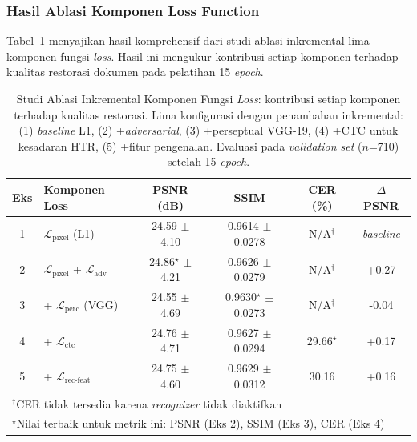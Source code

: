 \documentclass[12pt,a4paper]{article}
\begin{document}
\subsubsection{Hasil Ablasi Komponen Loss Function}
\label{subsubsec:hasil-ablasi-loss}

Tabel~\ref{tab:ablasi-loss-results} menyajikan hasil komprehensif dari studi ablasi inkremental lima komponen fungsi \textit{loss}. Hasil ini mengukur kontribusi setiap komponen terhadap kualitas restorasi dokumen pada pelatihan 15 \textit{epoch}.

\begin{table}[H]
\renewcommand{\arraystretch}{1.3}
\centering
\caption{Studi Ablasi Inkremental Komponen Fungsi \textit{Loss}: kontribusi setiap komponen terhadap kualitas restorasi. Lima konfigurasi dengan penambahan inkremental: (1) \textit{baseline} L1, (2) +\textit{adversarial}, (3) +perseptual VGG-19, (4) +CTC untuk kesadaran HTR, (5) +fitur pengenalan. Evaluasi pada \textit{validation set} ($n$=710) setelah 15 \textit{epoch}.}
\label{tab:ablasi-loss-results}
\small
\begin{tabular}{|c|l|c|c|c|c|}
\hline
\textbf{Eks} & \textbf{Komponen Loss} & \textbf{PSNR (dB)} & \textbf{SSIM} & \textbf{CER (\%)} & \textbf{$\Delta$ PSNR} \\
\hline
1 & $\mathcal{L}_{\text{pixel}}$ (L1) & 24.59 $\pm$ 4.10 & 0.9614 $\pm$ 0.0278 & N/A$^{\dagger}$ & \textit{baseline} \\
2 & $\mathcal{L}_{\text{pixel}}$ + $\mathcal{L}_{\text{adv}}$ & 24.86$^{\star}$ $\pm$ 4.21 & 0.9626 $\pm$ 0.0279 & N/A$^{\dagger}$ & +0.27 \\
3 & + $\mathcal{L}_{\text{perc}}$ (VGG) & 24.55 $\pm$ 4.69 & 0.9630$^{\star}$ $\pm$ 0.0273 & N/A$^{\dagger}$ & -0.04 \\
4 & + $\mathcal{L}_{\text{ctc}}$ & 24.76 $\pm$ 4.71 & 0.9627 $\pm$ 0.0294 & 29.66$^{\star}$ & +0.17 \\
5 & + $\mathcal{L}_{\text{rec-feat}}$ & 24.75 $\pm$ 4.60 & 0.9629 $\pm$ 0.0312 & 30.16 & +0.16 \\
\hline
\multicolumn{6}{|l|}{\footnotesize $^{\dagger}$CER tidak tersedia karena \textit{recognizer} tidak diaktifkan} \\
\multicolumn{6}{|l|}{\footnotesize $^{\star}$Nilai terbaik untuk metrik ini: PSNR (Eks 2), SSIM (Eks 3), CER (Eks 4)} \\
\hline
\end{tabular}
\end{table}
\end{document}

